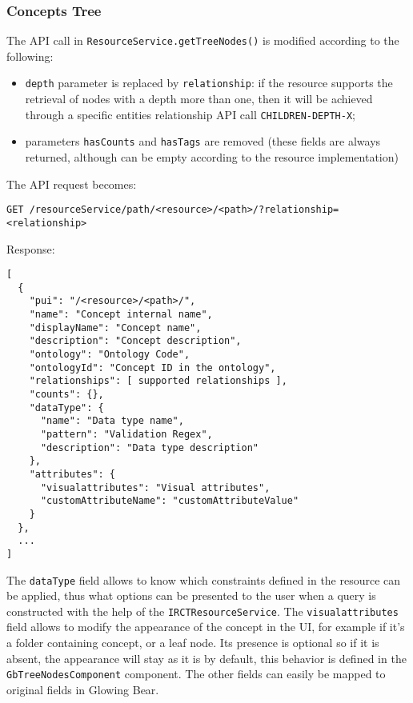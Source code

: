 
\subsubsection{Concepts Tree}
\label{sec:gb-tree}

The API call in \verb|ResourceService.getTreeNodes()| is modified according to the following:
\begin{itemize}
     \item \verb|depth| parameter is replaced by \verb|relationship|: if the resource supports the retrieval of nodes with a depth more than one, then it will be achieved through a specific entities relationship API call \verb|CHILDREN-DEPTH-X|; 
    \item parameters \verb|hasCounts| and \verb|hasTags| are removed (these fields are always returned, although can be empty according to the resource implementation)
\end{itemize}

The API request becomes:
\begin{verbatim}
GET /resourceService/path/<resource>/<path>/?relationship=<relationship>
\end{verbatim}

Response:
\begin{verbatim}
[
  {
    "pui": "/<resource>/<path>/",
    "name": "Concept internal name",
    "displayName": "Concept name",
    "description": "Concept description",
    "ontology": "Ontology Code",
    "ontologyId": "Concept ID in the ontology",
    "relationships": [ supported relationships ],
    "counts": {},
    "dataType": {
      "name": "Data type name",
      "pattern": "Validation Regex",
      "description": "Data type description"
    },
    "attributes": {
      "visualattributes": "Visual attributes",
      "customAttributeName": "customAttributeValue"
    }
  },
  ...
]
\end{verbatim}

The \verb|dataType| field allows to know which constraints defined in the resource can be applied, thus what options can be presented to the user when a query is constructed with the help of the \verb|IRCTResourceService|.
The \verb|visualattributes| field allows to modify the appearance of the concept in the UI, for example if it's a folder containing concept, or a leaf node. 
Its presence is optional so if it is absent, the appearance will stay as it is by default, this behavior is defined in the \verb|GbTreeNodesComponent| component.
The other fields can easily be mapped to original fields in Glowing Bear.

